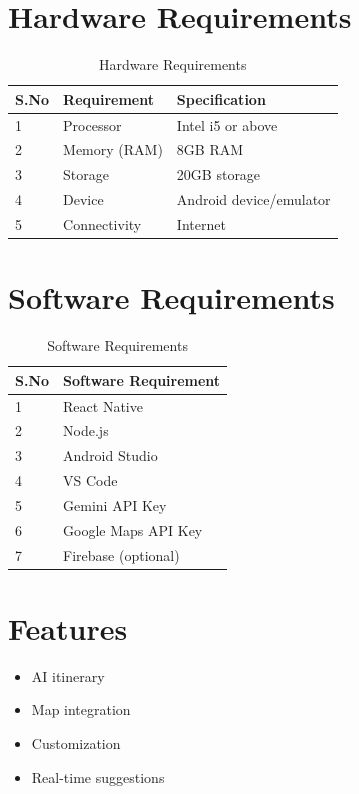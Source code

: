 \documentclass[12pt,a4paper]{article}
\begin{document}
\section{Hardware Requirements}
\begin{table}[h!]
    \centering
    \renewcommand{\arraystretch}{1.25}
    \begin{tabular}{|m{0.8cm}|m{10cm}|m{4cm}|}
        \hline
        \textbf{S.No} & \textbf{Requirement} & \textbf{Specification} \\
        \hline
        1 & Processor & Intel i5 or above \\
        \hline
        2 & Memory (RAM) & 8GB RAM \\
        \hline
        3 & Storage & 20GB storage \\
        \hline
        4 & Device & Android device/emulator \\
        \hline
        5 & Connectivity & Internet \\
        \hline
    \end{tabular}
    \caption{Hardware Requirements}
\end{table}

\section{Software Requirements}
\begin{table}[h!]
    \centering
    \renewcommand{\arraystretch}{1.25}
    \begin{tabular}{|m{0.8cm}|m{14.2cm}|}
        \hline
        \textbf{S.No} & \textbf{Software Requirement} \\
        \hline
        1 & React Native \\
        \hline
        2 & Node.js \\
        \hline
        3 & Android Studio \\
        \hline
        4 & VS Code \\
        \hline
        5 & Gemini API Key \\
        \hline
        6 & Google Maps API Key \\
        \hline
        7 & Firebase (optional) \\
        \hline
    \end{tabular}
    \caption{Software Requirements}
\end{table}

\section{Features}
\begin{itemize}
    \item AI itinerary
    \item Map integration
    \item Customization
    \item Real-time suggestions
\end{itemize}
\end{document}
